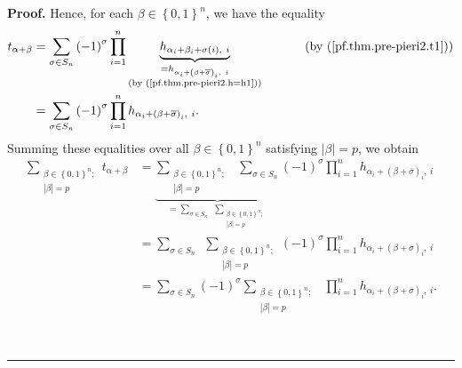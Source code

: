 \documentclass[numbers=enddot,12pt,final,onecolumn,notitlepage,english]{scrartcl}%
\theoremstyle{definition}
\newenvironment{proof}[1][Proof]{\noindent\textbf{#1.} }{\ \rule{0.5em}{0.5em}}
\let\sumnonlimits\sum
\let\prodnonlimits\prod
\renewcommand{\sum}{\sumnonlimits\limits}
\renewcommand{\prod}{\prodnonlimits\limits}
\newenvironment{verlong}{}{}
\begin{document}
\begin{verlong}
\begin{proof}
Hence, for each $\beta\in\left\{  0,1\right\}  ^{n}$, we have the equality%
\begin{align*}
t_{\alpha+\beta}  &  =\sum_{\sigma\in S_{n}}\left(  -1\right)  ^{\sigma}%
\prod_{i=1}^{n}\underbrace{h_{\alpha_{i}+\beta_{i}+\sigma\left(  i\right)
,\ i}}_{\substack{=h_{\alpha_{i}+\left(  \beta+\overline{\sigma}\right)
_{i},\ i}\\\text{(by (\ref{pf.thm.pre-pieri2.h=h1}))}}%
}\ \ \ \ \ \ \ \ \ \ \left(  \text{by (\ref{pf.thm.pre-pieri2.t1})}\right) \\
&  =\sum_{\sigma\in S_{n}}\left(  -1\right)  ^{\sigma}\prod_{i=1}^{n}%
h_{\alpha_{i}+\left(  \beta+\overline{\sigma}\right)  _{i},\ i}.
\end{align*}
Summing these equalities over all $\beta\in\left\{  0,1\right\}  ^{n}$
satisfying $\left\vert \beta\right\vert =p$, we obtain%
\begin{align}
\sum_{\substack{\beta\in\left\{  0,1\right\}  ^{n};\\\left\vert \beta
\right\vert =p}}t_{\alpha+\beta}  &  =\underbrace{\sum_{\substack{\beta
\in\left\{  0,1\right\}  ^{n};\\\left\vert \beta\right\vert =p}}\ \ \sum
_{\sigma\in S_{n}}}_{=\sum_{\sigma\in S_{n}}\ \ \sum_{\substack{\beta
\in\left\{  0,1\right\}  ^{n};\\\left\vert \beta\right\vert =p}}}\left(
-1\right)  ^{\sigma}\prod_{i=1}^{n}h_{\alpha_{i}+\left(  \beta+\overline
{\sigma}\right)  _{i},\ i}\nonumber\\
&  =\sum_{\sigma\in S_{n}}\ \ \sum_{\substack{\beta\in\left\{  0,1\right\}
^{n};\\\left\vert \beta\right\vert =p}}\left(  -1\right)  ^{\sigma}\prod
_{i=1}^{n}h_{\alpha_{i}+\left(  \beta+\overline{\sigma}\right)  _{i}%
,\ i}\nonumber\\
&  =\sum_{\sigma\in S_{n}}\left(  -1\right)  ^{\sigma}\sum_{\substack{\beta
\in\left\{  0,1\right\}  ^{n};\\\left\vert \beta\right\vert =p}}\ \ \prod
_{i=1}^{n}h_{\alpha_{i}+\left(  \beta+\overline{\sigma}\right)  _{i},\ i}.
\label{pf.thm.pre-pieri2.sumt=1}%
\end{align}



\end{proof}
\end{verlong}
\end{document}
